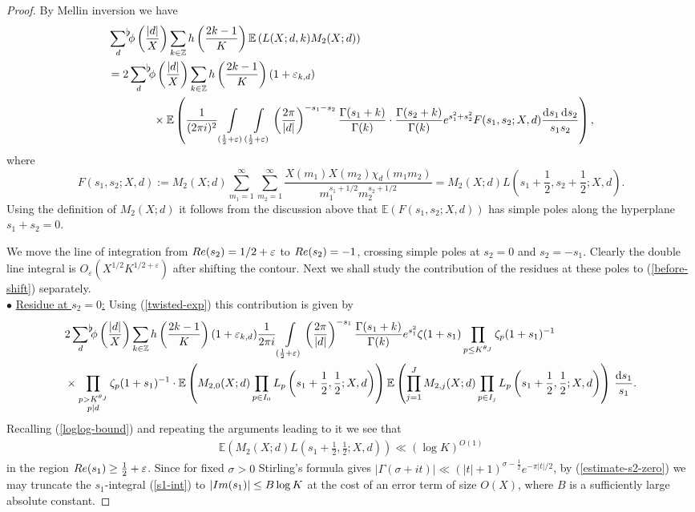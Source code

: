 \documentclass[10pt,a4paper]{amsart}
\renewcommand{\Im}{\textnormal{Im}}
\renewcommand{\Re}{\textnormal{Re}}
\newcommand\Z{\mathbb{Z}}
\newcommand\eps{\varepsilon}
\newcommand{\sumflat}{\mathop{{\sum}^{\raisebox{-3pt}{\makebox[0pt][l]{$\flat$}}}}}
\begin{document}
\begin{proof} By Mellin inversion we have
\begin{align}\label{before-shift}
&\sumflat_{d}\phi\left(\frac{|d|}X\right)\sum_{k\in\Z}h\left(\frac{2k-1}K\right)\mathbb E\left(L(X;d,k)M_2(X;d)\right) \nonumber\\
&=2\sumflat_{d}\phi\left(\frac{|d|}X\right)\sum_{k\in\Z}h\left(\frac{2k-1}K\right)(1+\varepsilon_{k,d}) \nonumber\\
&\qquad\qquad\times\mathbb E\left(\frac1{(2\pi i)^2}\int\limits_{(\frac12+\eps)}\int\limits_{(\frac12+\eps)}\left(\frac{2\pi}{|d|}\right)^{-s_1-s_2}\frac{\Gamma(s_1+k)}{\Gamma(k)}\cdot\frac{\Gamma (s_2+k)}{\Gamma(k)}e^{s_1^2+s_2^2}F(s_1,s_2;X,d)\frac{\mathrm d s_1\,\mathrm d s_2}{s_1s_2}\right), 
\end{align}
where 
\[ 
F(s_1,s_2;X,d):=M_2(X;d)\sum_{m_1=1}^\infty\sum_{m_2=1}^\infty\frac{X(m_1)X(m_2)\chi_d(m_1m_2)}{m_1^{s_1+1/2}m_2^{s_2+1/2}}=M_2(X;d)L\left(s_1+\frac12,s_2+\frac12;X,d\right).
\]
Using the definition of $M_2(X;d)$ it follows from the discussion above that $\mathbb E(F(s_1,s_2;X,d))$ has simple poles along the hyperplane $s_1+s_2=0$. 

We move the line of integration from $\Re(s_2)=1/2+\eps$ to $\Re(s_2)=-1$, crossing simple poles at $s_2=0$ and $s_2=-s_1$. Clearly the double line integral is $O_\eps(X^{1/2}K^{1/2+\varepsilon})$ after shifting the contour. Next we shall study the contribution of the residues at these poles to (\ref{before-shift}) separately. \\

\noindent $\bullet$ \underline{Residue at $s_2=0$:} Using (\ref{twisted-exp}) this contribution is given by
\begin{align}\label{s1-int}
&2\sumflat_{d}\phi\left(\frac{|d|}X\right)\sum_{k\in\Z}h\left(\frac{2k-1}K\right)(1+\eps_{k,d})\frac1{2\pi i}\int\limits_{(\frac12+\eps)}\left(\frac{2\pi}{|d|}\right)^{-s_1}\frac{\Gamma(s_1+k)}{\Gamma(k)}e^{s_1^2}\zeta(1+s_1)\prod_{p\leq K^{\theta_J}}\zeta_p(1+s_1)^{-1}\\
&\times\prod_{\substack{p>K^{\theta_J}\\
p|d}}\zeta_p(1+s_1)^{-1}\cdot\mathbb E\left(M_{2,0}(X;d)\prod_{p\in I_0}L_p\left(s_1+\frac12,\frac12;X,d\right)\right)\mathbb E\left(\prod_{j=1}^J M_{2,j}(X;d)\prod_{p\in I_j}L_p\left(s_1+\frac12,\frac12;X,d\right)\right)\,\frac{\mathrm d s_1}{s_1}. \nonumber
\end{align}
Recalling (\ref{loglog-bound}) and repeating the arguments leading to it we see that 
\begin{align}\label{estimate-s2-zero}
\mathbb E\left(M_2(X;d)L\left(s_1+\frac12,\frac12;X,d\right)\right)\ll (\log K)^{O(1)}
\end{align}
in the region $\Re(s_1)\geq\frac12+\eps$. Since for fixed $\sigma>0$ Stirling's formula gives $|\Gamma(\sigma+it)|\ll (|t|+1)^{\sigma-\frac12}e^{-\pi|t|/2}$, by (\ref{estimate-s2-zero}) we may truncate the $s_1$-integral (\ref{s1-int}) to $|\Im(s_1)|\leq B\log K$ at the cost of an error term of size $O(X)$, where $B$ is a sufficiently large absolute constant. 
 

\end{proof}
\end{document}
